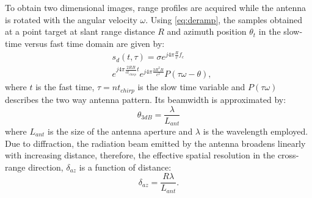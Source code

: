 To obtain two dimensional images, range profiles are acquired while the antenna is rotated with the angular velocity $\omega$.
Using \autoref{eq:deramp}, the samples obtained at a point target at slant range distance $R$ and azimuth position $\theta_{t}$ in the slow-time versus fast time domain are given by:
\begin{equation}\label{eq:signal_model}
	\begin{aligned}
	& s_{d}\left(t,\tau\right) = \sigma e^{j 4 \pi \frac{ R}{c}f_c}   \\
	& e^{j 4 \pi \frac{2 R B }{c t_{chirp}} t}  e^{j 4 \pi \frac{2 R^2 B}{c^2}} P\left(\tau \omega - \theta\right),
	\end{aligned}
\end{equation} 
where $t$ is the fast time, $\tau = n t_{chirp}$ is the slow time variable and $P\left(\tau \omega\right)$ describes the two way antenna pattern. Its beamwidth is approximated by:
\begin{equation}\label{eq:azimuth_resolution}
	\theta_{3dB} = \frac{\lambda}{L_{ant}}
\end{equation}
where $L_{ant}$ is the size of the antenna aperture and $\lambda$ is the wavelength employed.
Due to diffraction, the radiation beam emitted by the antenna broadens linearly with increasing distance,
therefore, the effective spatial resolution in the cross-range direction, $\delta_{az}$ is a function of distance:
\begin{equation}\label{eq:azimuth_ground_resolution}
	\delta_{az} = \frac{R \lambda}{L_{ant}}.
\end{equation}
